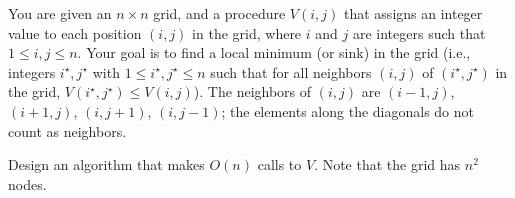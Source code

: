 \problem{}
You are given an $n \times n$ grid, and a procedure $V(i,j)$ that assigns an integer value to each position $(i,j)$ in the grid, where $i$ and $j$ are integers such that $1 \le i,j \le n$. Your goal is to find a local minimum (or sink) in the grid (i.e., integers $i^{\star}, j^{\star}$ with $1 \le i^{\star}, j^{\star} \le n$ such that for all neighbors $(i,j)$ of $(i^{\star},j^{\star})$ in the grid, $V(i^{\star},j^{\star}) \le V(i,j)$). The neighbors of $(i,j)$ are $(i-1,j)$, $(i+1,j)$, $(i,j+1)$, $(i,j-1)$; the elements along the diagonals do not count
as neighbors.

Design an algorithm that makes $O(n)$ calls to $V$. Note that the grid has $n^{2}$ nodes.

\solution{
}
\newpage